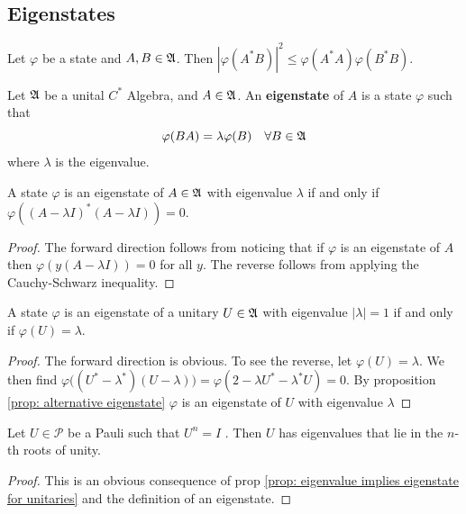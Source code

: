 \documentclass[11pt]{amsart}
\begin{document}
\subsection{Eigenstates}
\begin{lem}
    Let $\varphi$ be a state and $A,B\in\mathfrak{A}$. Then  $|\varphi(A^*B)|^2\leq\varphi(A^*A)\varphi(B^*B)$.
\end{lem}
\begin{defn}
    Let $\mathfrak{A}$ be a unital $C^*$ Algebra, and $A\in\mathfrak{A}$. An \textbf{eigenstate} of $A$ is a state $\varphi$ such that 
    \[
        \varphi(BA)=\lambda\varphi(B) \quad\forall B\in\mathfrak{A}
    \]
    where $\lambda$ is the eigenvalue.
\end{defn}
\begin{prop}\label{prop: alternative eigenstate}
    A state $\varphi$ is an eigenstate of $A\in \mathfrak{A}$ with eigenvalue $\lambda$ if and only if $\varphi((A-\lambda I)^*(A-\lambda I))=0$.
    \begin{proof}
        The forward direction follows from noticing that if $\varphi$ is an eigenstate of $A$ then $\varphi(y(A-\lambda I))=0$ for all $y$. The reverse follows from applying the Cauchy-Schwarz inequality. 
    \end{proof}
\end{prop}
\begin{prop}\label{prop: eigenvalue implies eigenstate for unitaries}
    A state $\varphi$ is an eigenstate of a unitary $U\in \mathfrak{A}$ with eigenvalue $|\lambda|=1$ if and only if $\varphi(U)=\lambda$.
    \begin{proof}
        The forward direction is obvious. To see the reverse, let $\varphi(U)=\lambda$. We then find $\varphi\bigl((U^*-\lambda^*)(U-\lambda)\bigr)=\varphi(2-\lambda U^*-\lambda^*U)=0$. By proposition \ref{prop: alternative eigenstate} $\varphi$ is an eigenstate of $U$ with eigenvalue $\lambda$  
    \end{proof}
\end{prop}
\begin{lem}
    Let $U\in\mathcal P$ be a Pauli such that $U^n=I$ . Then $U$ has eigenvalues that lie in the $n$-th roots of unity. 
    \begin{proof}
         This is an obvious consequence of prop \ref{prop: eigenvalue implies eigenstate for unitaries} and the definition of an eigenstate. 
    \end{proof}
\end{lem}
\end{document}
